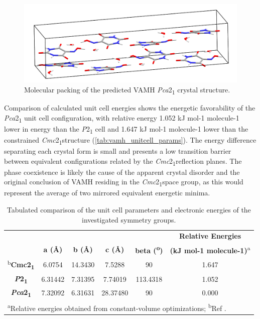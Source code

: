 \begin{figure}[ht!]
  \center
  \includegraphics[width=1\linewidth]{src/figures/VAMH_figures/vamh_fig8.png}
  \caption{Molecular packing of the predicted VAMH \textit{Pca}2\textsubscript{1} crystal structure.}
  \label{fig:vamh_pca21}
\end{figure}
  
Comparison of calculated unit cell energies shows the energetic favorability of the \textit{Pca}2\textsubscript{1} unit cell configuration, with relative energy 1.052 kJ mol-1 molecule-1 lower in energy than the \textit{P}2\textsubscript{1} cell and 1.647 kJ mol-1 molecule-1 lower than the constrained \textit{Cmc}2\textsubscript{1}structure (\autoref{tab:vamh_unitcell_params}). The energy difference separating each crystal form is small and presents a low transition barrier between equivalent configurations related by the \textit{Cmc}2\textsubscript{1}reflection planes. The phase coexistence is likely the cause of the apparent crystal disorder and the original conclusion of VAMH residing in the \textit{Cmc}2\textsubscript{1}space group, as this would represent the average of two mirrored equivalent energetic minima. 


\begin{table}[h]
    \centering
    \caption{Tabulated comparison of the unit cell parameters and electronic energies of the investigated symmetry groups.}
    \begin{tabular}{cccccc}
    &&&&& \textbf{Relative Energies} \\
    & \textbf{a (Å)}& \textbf{b (Å)}& \textbf{c (Å)}& \textbf{beta (\textsuperscript{o}) }& \textbf{(kJ mol-1 molecule-1)}\textsuperscript{a}\\
    \hline
    \textsuperscript{b}\textbf{Cmc2\textsubscript{1}} & 6.0754 & 14.3430 & 7.5288 & 90 & 1.647 \\
    \textbf{\textit{P}2\textsubscript{1}}	& 6.31442 & 7.31395 & 7.74019 & 113.4318 & 1.052 \\
    \textbf{\textit{Pca}2\textsubscript{1}} & 7.32092 & 6.31631 & 28.37480 & 90 & 0.000 \\
    \hline
    \multicolumn{6}{l}{\textsuperscript{a}Relative energies obtained from constant-volume optimizations; \textsuperscript{b}Ref \citep{nichol_violuric_2005}.}
    \end{tabular}
    \label{tab:vamh_unitcell_params}
\end{table}

